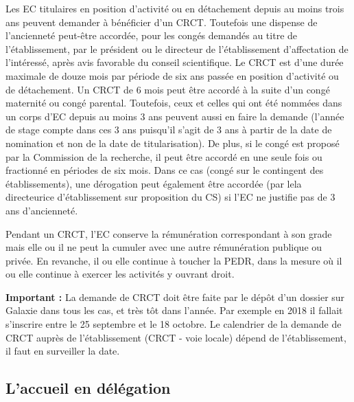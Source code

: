 Les EC titulaires en position d'activit\'e ou en d\'etachement
depuis au moins trois ans peuvent demander \`a b\'en\'eficier d'un CRCT.
Toutefois une dispense de l'anciennet\'e peut-\^etre accord\'ee, pour les cong\'es demand\'es au titre de l'\'etablissement, par le pr\'esident ou le directeur de l'\'etablissement d'affectation de l'int\'eress\'e, apr\`es avis favorable du conseil scientifique.
Le CRCT est d'une dur\'ee maximale
de douze mois par p\'eriode de six ans pass\'ee en position
d'activit\'e ou de d\'etachement. Un CRCT de 6 mois peut \^etre accord\'e
\`a la suite d'un cong\'e maternit\'e ou cong\'e parental.
Toutefois, ceux et celles qui ont \'et\'e
nomm\'e\mp e\mp s dans un corps d'EC depuis au moins 3 ans peuvent aussi
en faire la demande (l'ann\'ee de stage compte dans ces 3 ans
puisqu'il s'agit de 3 ans \`a partir de la date de nomination et
non de la date de titularisation). De plus, si le cong\'e est
propos\'e par la Commission de la recherche, il peut \^etre accord\'e en
une seule fois ou fractionn\'e en p\'eriodes de six mois.
 Dans ce cas (cong\'e sur le contingent des
\'etablissements), une d\'erogation peut \'egalement \^etre accord\'ee
(par le\mp la directeur\mp ice d'\'etablissement sur proposition
du CS) si l'EC ne justifie pas de 3 ans d'anciennet\'e.

Pendant un CRCT, l'EC conserve la r\'emun\'eration correspondant \`a son grade
mais elle ou il ne peut la cumuler avec une autre r\'emun\'eration publique ou priv\'ee.
En revanche, il ou elle continue \`a toucher la PEDR, dans la mesure o\`u il ou elle continue \`a exercer les activit\'es y ouvrant droit. 


\textbf{Important :} La demande de CRCT doit \^etre faite par le d\'ep\^ot d’un dossier sur Galaxie dans tous les cas, et tr\`es t\^ot dans l'ann\'ee. Par exemple en 2018 il fallait s'inscrire entre le 25 septembre et le 18 octobre. Le calendrier de la demande de CRCT aupr\`es de l’\'etablissement (CRCT - voie locale) d\'epend de l'\'etablissement, il faut en surveiller la date.

\subsection{L'accueil en d\'el\'egation}
\label{delegation}


